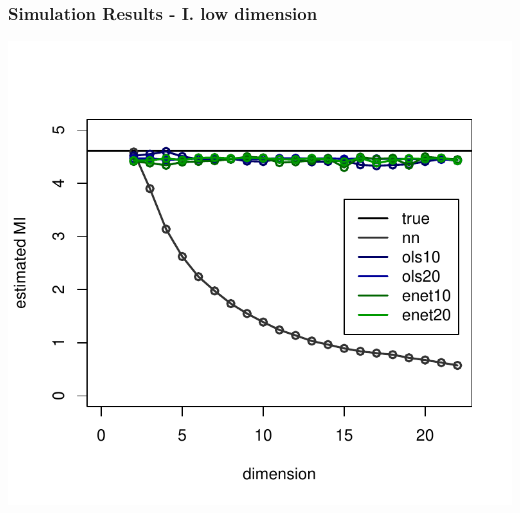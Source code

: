 \documentclass{beamer}
\begin{document}
\begin{frame}
\frametitle{Simulation Results - I. low dimension}
\begin{center}
\includegraphics[scale = 0.65]{../idloss/sim2a_fig1.pdf}
\end{center}
\end{frame}


\end{document}
